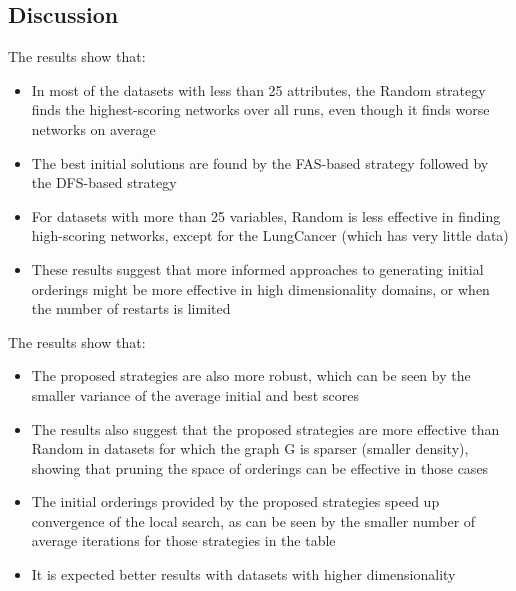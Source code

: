 \subsection{Discussion}
	\begin{frame}
		The results show that:
		\begin{itemize}
			\item In most of the datasets with less than 25 attributes, the Random strategy finds the highest-scoring networks over all runs, even though it finds worse networks on average
			\item The best initial solutions are found by the FAS-based strategy followed by the DFS-based strategy
			\item For datasets with more than 25 variables, Random is less effective in finding high-scoring networks, except for the LungCancer (which has very little data)
			\item These results suggest that more informed approaches to generating initial orderings might be more effective in high dimensionality domains, or when the number of restarts is limited
		\end{itemize}
	\end{frame}
	\begin{frame}
		The results show that:
		\begin{itemize}
			\item The proposed strategies are also more robust, which can be seen by the smaller variance of the average initial and best scores
			\item The results also suggest that the proposed strategies are more effective than Random in datasets for which the graph G is sparser (smaller density), showing that pruning the space of orderings can be effective in those cases
			\item The initial orderings provided by the proposed strategies speed up convergence of the local search, as can be seen by the smaller number of average iterations for those strategies in the table
			\item It is expected better results with datasets with higher dimensionality
		\end{itemize}
	\end{frame}